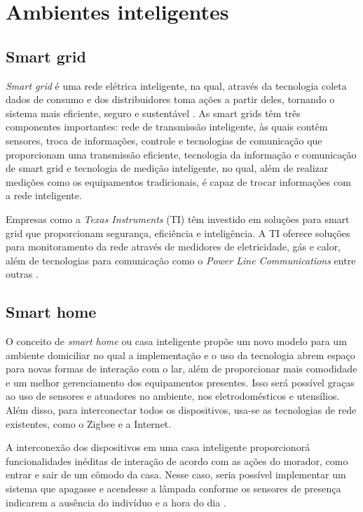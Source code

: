 \section{Ambientes inteligentes}

\subsection{Smart grid}

\textit{Smart grid} é uma rede elétrica inteligente, na qual, através da tecnologia coleta dados de consumo e dos distribuidores toma ações a partir deles, tornando o sistema mais eficiente, seguro e sustentável \cite{Cecilia2016}. As smart grids têm três componentes importantes: rede de transmissão inteligente, às quais contêm sensores, troca de informações, controle e tecnologias de comunicação que proporcionam uma transmissão eficiente, tecnologia da informação e comunicação de smart grid  e tecnologia de medição inteligente, no qual, além de realizar medições como os equipamentos tradicionais, é capaz de trocar informações com a rede inteligente. 

Empresas como a \textit{Texas Instruments} (TI) têm investido em soluções para smart grid que proporcionam segurança, eficiência e inteligência. A TI oferece soluções para monitoramento da rede através de medidores de eletricidade, gás e calor, além de tecnologias para comunicação como o 
\textit{Power Line Communications} entre outras \cite{TexasInstruments2017}.

\subsection{Smart home}

O conceito de \textit{smart home} ou casa inteligente propõe um novo modelo para um ambiente domiciliar no qual a implementação e o uso da tecnologia abrem espaço para novas formas de interação com o lar, além de proporcionar mais comodidade e um melhor gerenciamento dos equipamentos presentes. Isso será possível graças ao uso de sensores e atuadores no ambiente, nos eletrodomésticos e utensílios. Além disso, para interconectar todos os dispositivos, usa-se as tecnologias de rede existentes, como o Zigbee e a Internet.

A interconexão dos dispositivos em uma casa inteligente proporcionorá funcionalidades inéditas de interação de acordo com as ações do morador, como entrar e sair de um cômodo da casa. Nesse caso, seria possível implementar um sistema que apagasse e acendesse a lâmpada conforme os sensores de presença indicarem a ausência do indivíduo e a hora do dia \cite{audiovideo}.

